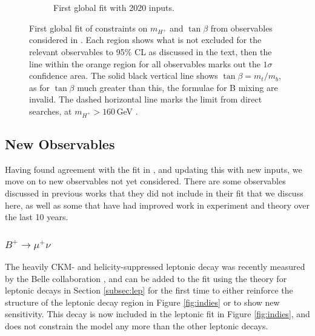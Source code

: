 \documentclass[a4paper,12pt]{article}
\begin{document}
\begin{figure}[ht]
\begin{subfigure}[b]{0.48\textwidth}
        \caption{\label{subfig:glob11}First global fit with 2020 inputs.}
    \end{subfigure}
    \caption{\label{fig:glob1} First global fit of constraints on $m_{H^+}$ and $\tan\beta$ from observables considered in \cite{desc}. 
    Each region shows what is not excluded for the relevant observables to 95\% CL as discussed in the text, then the line within the orange region for all observables marks out the $1\sigma$ confidence area. 
    The solid black vertical line shows $\tan\beta=m_t/m_b$, as for $\tan\beta$ much greater than this, the formulae for B mixing are invalid. 
    The dashed horizontal line marks the limit from direct searches, at $m_{H^+}>160\,$GeV \cite{dirhp}.}
\end{figure}

\subsection{New Observables}
\label{sec:rdbmu}
Having found agreement with the fit in \cite{desc}, and updating this with new inputs, we move on to new observables not yet considered. 
There are some observables discussed in previous works that they did not include in their fit that we discuss here, as well as some that have had improved work in experiment and theory over the last 10 years. 

\subsubsection{$B^+\to\mu^+\nu$}
The heavily CKM- and helicity-suppressed leptonic decay was recently measured by the Belle collaboration \cite{bmu}, and can be added to the fit using the theory for leptonic decays in Section \ref{subsec:lep} for the first time to either reinforce the structure of the leptonic decay region in Figure \ref{fig:indies} or to show new sensitivity.
This decay is now included in the leptonic fit in Figure \ref{fig:indies}, and does not constrain the model any more than the other leptonic decays. 
\end{document}
